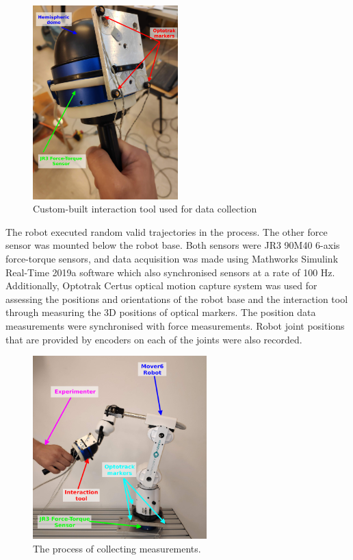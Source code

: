 \begin{figure}
    \centering
    \includegraphics[width=0.5\textwidth]{slike/Fig03_20.png}
    \caption{Custom-built interaction tool used for data collection}
    \label{fig:Tool}
\end{figure}

The robot executed random valid trajectories in the process. The other force sensor was mounted below the robot base. Both sensors were JR3 90M40 6-axis force-torque sensors, and data acquisition was made using Mathworks Simulink Real-Time 2019a software which also synchronised sensors at a rate of 100 Hz. Additionally, Optotrak Certus optical motion capture system was used for assessing the positions and orientations of the robot base and the interaction tool through measuring the 3D positions of optical markers. The position data measurements were synchronised with force measurements. Robot joint positions that are provided by encoders on each of the joints were also recorded.

\begin{figure}
    \centering
    \includegraphics[width=0.6\textwidth]{slike/Fig03_21.png}
    \caption{The process of collecting measurements.}
    \label{fig:Robot}
\end{figure}

